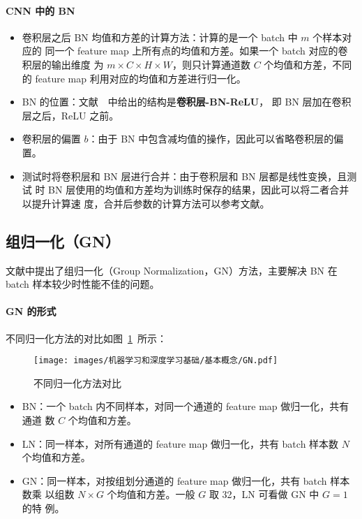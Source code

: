 \paragraph{CNN 中的 BN}
\begin{itemize}
  \item 卷积层之后 BN 均值和方差的计算方法：计算的是一个 batch 中 $m$ 个样本对应的
    同一个 feature map 上所有点的均值和方差。如果一个 batch 对应的卷积层的输出维度
    为 $m \times C \times H \times W$，则只计算通道数 $C$ 个均值和方差，不同
    的 feature map 利用对应的均值和方差进行归一化。
  \item BN 的位置：文献~~中给出的结构是\textbf{卷积层-BN-ReLU}，
    即 BN 层加在卷积层之后，ReLU 之前。
  \item 卷积层的偏置 $b$：由于 BN 中包含减均值的操作，因此可以省略卷积层的偏置。
  \item 测试时将卷积层和 BN 层进行合并：由于卷积层和 BN 层都是线性变换，且测试
    时 BN 层使用的均值和方差均为训练时保存的结果，因此可以将二者合并以提升计算速
    度，合并后参数的计算方法可以参考文献。
\end{itemize}

\subsection{组归一化（GN）}
\label{sub:GN}

文献中提出了组归一化（Group Normalization，GN）方法，主要解决 BN
在 batch 样本较少时性能不佳的问题。

\paragraph{GN 的形式}
不同归一化方法的对比如图~\ref{fig:all-norm}~所示：
\begin{figure}[ht]
  \centering
  \texttt{[image: images/机器学习和深度学习基础/基本概念/GN.pdf]}
  \caption{不同归一化方法对比}
  \label{fig:all-norm}
\end{figure}

\begin{itemize}
  \item BN：一个 batch 内不同样本，对同一个通道的 feature map 做归一化，共有通道
    数 $C$ 个均值和方差。
  \item LN：同一样本，对所有通道的 feature map 做归一化，共有 batch 样本数 $N$
    个均值和方差。
  \item GN：同一样本，对按组划分通道的 feature map 做归一化，共有 batch 样本数乘
    以组数 $N \times G$ 个均值和方差。一般 $G$ 取 32，LN 可看做 GN 中 $G=1$ 的特
    例。
\end{itemize}

